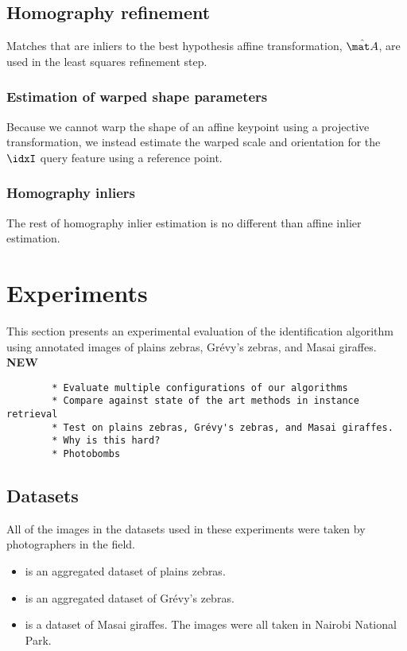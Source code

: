     \subsection{Homography refinement}
        Matches that are inliers to the best hypothesis affine transformation, $\HypothAffMat$, are used in the least
          squares refinement step.
        
        \subsubsection{Estimation of warped shape parameters}
            Because we cannot warp the shape of an affine keypoint using a projective transformation, we instead
              estimate the warped scale and orientation for the $\idxI$\th{} query feature using a reference point.
            
        \subsubsection{Homography inliers}
            The rest of homography inlier estimation is no different than affine inlier estimation.

\section{Experiments}
    This section presents an experimental evaluation of the identification algorithm using annotated images of plains
      zebras, Grévy's zebras, and Masai giraffes.
    {\large{\textbf{NEW}}}

    \begin{verbatim}
        * Evaluate multiple configurations of our algorithms
        * Compare against state of the art methods in instance retrieval
        * Test on plains zebras, Grévy's zebras, and Masai giraffes.
        * Why is this hard?
        * Photobombs
    \end{verbatim}

    \subsection{Datasets}
        All of the images in the datasets used in these experiments were taken by photographers in the field.
        
        \begin{itemize}
            \item \textbf{\pzmasterI{}} is an aggregated dataset of
                plains zebras.
                
            \item \textbf{\gzall{}} is an aggregated dataset of Grévy's
                zebras.
                
            \item \textbf{\girmmasterI{}} is a dataset of Masai giraffes.
                The images were all taken in Nairobi National Park.
        \end{itemize}

